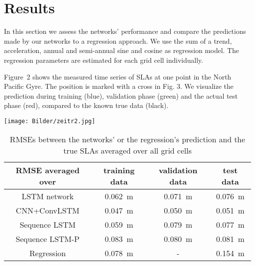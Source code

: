 \documentclass{article}
\begin{document}
\section{Results}
\label{sec:majhead}


In this section we assess the networks' performance and compare the predictions made by our networks to a regression approach. We use the sum of a trend, acceleration, annual and semi-annual sine and cosine as regression model. The regression parameters are estimated for each grid cell individually.

Figure~2 shows the measured time series of SLAs at one point in the North Pacific Gyre.
The position is marked with a cross in Fig. 3. 
We visualize the prediction during training (blue), validation phase (green) and the actual test phase (red), compared to the known true data (black). 

\vspace{0.6cm}

\hspace{-0.65cm}
\begin{minipage}[t!]{0.45\textwidth}
\begin{center}
	\texttt{[image: Bilder/zeitr2.jpg]}
	\vspace{-0.2cm}
\end{center}
\end{minipage}



\setlength{\belowrulesep}{0pt}
\hspace{-0.6cm}
\begin{table}
{\fontsize{8.5}{10} \selectfont 
\begin{tabular}{|c|c|c|c|}
\hline 
RMSE averaged over & training data & validation data & test data \\
\toprule[1pt]
LSTM network & 0.062~m & 0.071~m & 0.076~m \\ 
\hline 
CNN+ConvLSTM & 0.047~m & 0.050~m & 0.051~m \\ 
\hline 
Sequence LSTM & 0.059~m & 0.079~m & 0.077~m \\ 
\hline 
Sequence LSTM-P & 0.083~m & 0.080~m & 0.081~m \\ 
\hline 
Regression & 0.078~m & - & 0.154~m \\ 
\hline 
\end{tabular} 
}
\vspace{-0.35cm}
\caption{RMSEs between the networks' or the regression's prediction and the true SLAs averaged over all grid cells}
\end{table}
\end{document}
